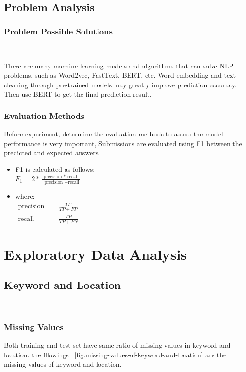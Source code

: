 \subsection{Problem Analysis}

\subsubsection{Problem Possible Solutions}
\

There are many machine learning models and algorithms 
that can solve NLP problems, such as Word2vec, 
FastText, BERT, etc. Word embedding and text cleaning 
through pre-trained models may greatly improve 
prediction accuracy. Then use BERT to 
get the final prediction result. 


\subsubsection{Evaluation Methods}


Before experiment, determine the evaluation methods
to assess the model performance is very important,
Submissions are evaluated using F1 
between the predicted and expected answers.

\begin{itemize}
	\item
	F1 is calculated as follows: \\[5 pt]
	$F _ { 1 } = 2 * \frac { \text { precision } * \text { recall } } { \text { precision } + \text {recall} }$
	\\[5 pt]
	\item
	where: \\[5 pt]
	$\begin{aligned} \text {precision} & = \frac { T P } { T P + F P } \\ \text {recall} & = \frac { T P } { T P + F N } \end{aligned}$
\end{itemize}


\section{Exploratory Data Analysis} \label{sec-data_exploration}

\subsection{Keyword and Location}
\

\subsubsection{Missing Values}
Both training and test set have same ratio 
of missing values in keyword and location.
the fllowings ~\cref{fig:missing-values-of-keyword-and-location} are the  
missing values of keyword and location.

